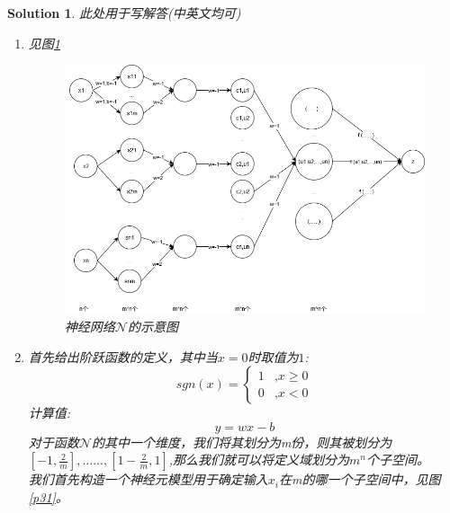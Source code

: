 \documentclass[a4paper,UTF8]{article}
\numberwithin{equation}{section}
\newtheorem*{solution}{Solution}
\begin{document}
 \begin{solution}
	此处用于写解答(中英文均可)
	\begin{enumerate}[ {(}1{)}]
		\item 见图\ref{p30}
		 	\begin{figure}[!h]
				\centering   
				\includegraphics[width=1\textwidth, height=0.85\textwidth]{p30.png}  
				\caption{神经网络$\mathcal{N}$的示意图} 
				\label{p30}
			\end{figure}
		\pagebreak
		
		\item 首先给出阶跃函数的定义，其中当$x=0$时取值为$1$:
		 $$sgn(x) = \begin{cases}
		 1& \text{,$x \geq 0$}\\
		 0& \text{,$x < 0$}
		 \end{cases}$$
		 计算值:$$y = wx-b$$
		 对于函数$\mathcal{N}$的其中一个维度，我们将其划分为m份，则其被划分为$[-1,\frac{2}{m}],......,[1-\frac{2}{m},1]$,那么我们就可以将定义域划分为$m^n$个子空间。\\
		 我们首先构造一个神经元模型用于确定输入$x_i$在m的哪一个子空间中，见图\ref{p31}。\\
		 

\end{enumerate}
\end{solution}
\end{document}
